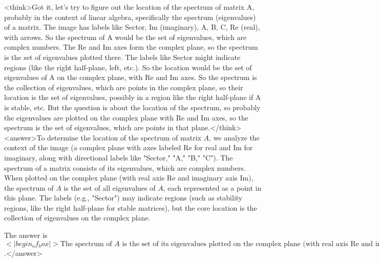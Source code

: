 <think>Got it, let's try to figure out the location of the spectrum of matrix A, probably in the context of linear algebra, specifically the spectrum (eigenvalues) of a matrix. The image has labels like Sector, Im (imaginary), A, B, C, Re (real), with arrows. So the spectrum of A would be the set of eigenvalues, which are complex numbers. The Re and Im axes form the complex plane, so the spectrum is the set of eigenvalues plotted there. The labels like Sector might indicate regions (like the right half-plane, left, etc.). So the location would be the set of eigenvalues of A on the complex plane, with Re and Im axes. So the spectrum is the collection of eigenvalues, which are points in the complex plane, so their location is the set of eigenvalues, possibly in a region like the right half-plane if A is stable, etc. But the question is about the location of the spectrum, so probably the eigenvalues are plotted on the complex plane with Re and Im axes, so the spectrum is the set of eigenvalues, which are points in that plane.</think><answer>To determine the location of the spectrum of matrix \( A \), we analyze the context of the image (a complex plane with axes labeled \( \text{Re} \) for real and \( \text{Im} \) for imaginary, along with directional labels like "Sector," "A," "B," "C"). The spectrum of a matrix consists of its eigenvalues, which are complex numbers. When plotted on the complex plane (with real axis \( \text{Re} \) and imaginary axis \( \text{Im} \)), the spectrum of \( A \) is the set of all eigenvalues of \( A \), each represented as a point in this plane. The labels (e.g., "Sector") may indicate regions (such as stability regions, like the right half-plane for stable matrices), but the core location is the collection of eigenvalues on the complex plane.  

The answer is \(<|begin_of_box|>\text{The spectrum of } A \text{ is the set of its eigenvalues plotted on the complex plane (with real axis } \text{Re} \text{ and imaginary axis } \text{Im})<|end_of_box|>\).</answer>